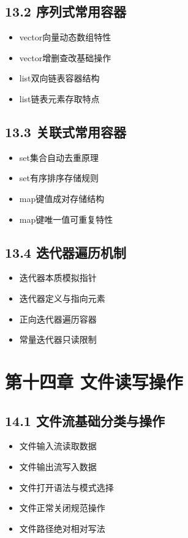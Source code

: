 \subsection{13.2 序列式常用容器}
\begin{itemize}
\item vector向量动态数组特性
\item vector增删查改基础操作
\item list双向链表容器结构
\item list链表元素存取特点
\end{itemize}

\subsection{13.3 关联式常用容器}
\begin{itemize}
\item set集合自动去重原理
\item set有序排序存储规则
\item map键值成对存储结构
\item map键唯一值可重复特性
\end{itemize}

\subsection{13.4 迭代器遍历机制}
\begin{itemize}
\item 迭代器本质模拟指针
\item 迭代器定义与指向元素
\item 正向迭代器遍历容器
\item 常量迭代器只读限制
\end{itemize}

\section{第十四章 文件读写操作}
\subsection{14.1 文件流基础分类与操作}
\begin{itemize}
\item 文件输入流读取数据
\item 文件输出流写入数据
\item 文件打开语法与模式选择
\item 文件正常关闭规范操作
\item 文件路径绝对相对写法
\end{itemize}

